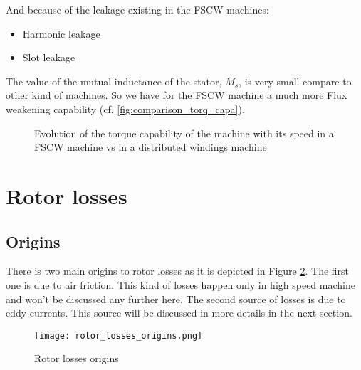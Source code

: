 And because of the leakage existing in the FSCW machines:
\begin{itemize}
    \item Harmonic leakage
    \item Slot leakage
\end{itemize}
The value of the mutual inductance of the stator, $M_s$, is very small compare to other kind of machines. So we have for the FSCW machine a much more Flux weakening capability (cf. \autoref{fig:comparison_torq_capa}). 

\begin{figure}[H]
    \centering
    \caption{Evolution of the torque capability of the machine with its speed in a FSCW machine vs in a distributed windings machine}
    \label{fig:comparison_torq_capa}
\end{figure}

\section{Rotor losses}
\subsection{Origins}
There is two main origins to rotor losses as it is depicted in Figure \ref{rotor_losses_origins}. The first one is due to air friction. This kind of losses happen only in high speed machine and won't be discussed any further here. The second source of losses is due to eddy currents. This source will be discussed in more details in the next section.
\begin{figure}[H]
    \centering
    \texttt{[image: rotor\_losses\_origins.png]}
    \caption{Rotor losses origins}
    \label{rotor_losses_origins}
\end{figure}
